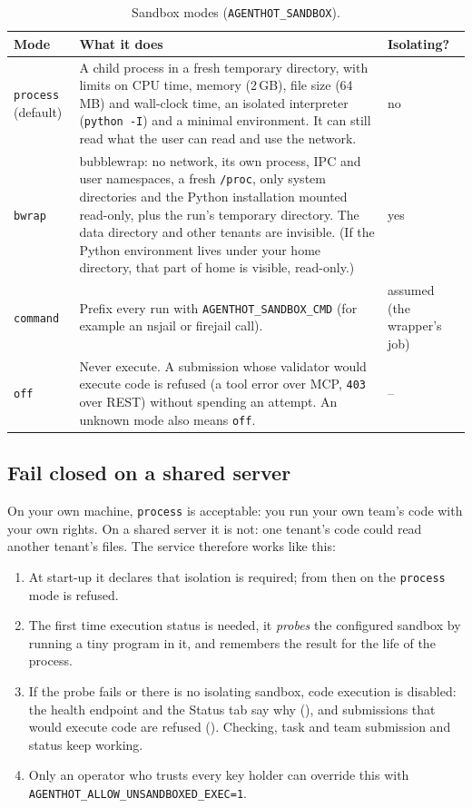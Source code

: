 \documentclass[10pt,a4paper]{article}
\newcommand{\code}[1]{\texttt{#1}}
\newcommand{\file}[1]{\texttt{#1}}
\begin{document}
\begin{table}[!htb]
\centering\small
\caption{Sandbox modes (\code{AGENTHOT\_SANDBOX}).}
\label{tab:sandbox}
\begin{tabularx}{\textwidth}{@{}l Y l@{}}
\toprule
Mode & What it does & Isolating? \\
\midrule
\code{process} (default) & A child process in a fresh temporary directory, with limits on CPU time, memory (2\,GB), file size (64\,MB) and wall-clock time, an isolated interpreter (\code{python -I}) and a minimal environment. It can still read what the user can read and use the network. & no \\
\code{bwrap} & bubblewrap: no network, its own process, IPC and user namespaces, a fresh \file{/proc}, only system directories and the Python installation mounted read-only, plus the run's temporary directory. The data directory and other tenants are invisible. (If the Python environment lives under your home directory, that part of home is visible, read-only.) & yes \\
\code{command} & Prefix every run with \code{AGENTHOT\_SANDBOX\_CMD} (for example an nsjail or firejail call). & assumed (the wrapper's job) \\
\code{off} & Never execute. A submission whose validator would execute code is refused (a tool error over MCP, \code{403} over REST) without spending an attempt. An unknown mode also means \code{off}. & -- \\
\bottomrule
\end{tabularx}
\end{table}

\subsection{Fail closed on a shared server}

On your own machine, \code{process} is acceptable: you run your own team's
code with your own rights. On a shared server it is not: one tenant's code
could read another tenant's files. The service therefore works like this:

\begin{enumerate}[itemsep=1pt]
\item At start-up it declares that isolation is required; from then on the
\code{process} mode is refused.
\item The first time execution status is needed, it \emph{probes} the
configured sandbox by running a tiny program in it, and remembers the result
for the life of the process.
\item If the probe fails or there is no isolating sandbox, code execution is
disabled: the health endpoint and the Status tab say why (),
and submissions that would execute code are refused ().
Checking, task and team submission and status keep working.
\item Only an operator who trusts every key holder can override this with
\code{AGENTHOT\_ALLOW\_UNSANDBOXED\_EXEC=1}.
\end{enumerate}
\end{document}
